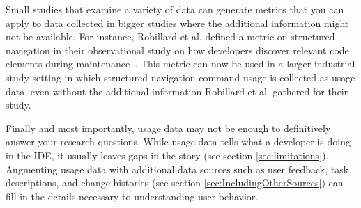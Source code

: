 

Small studies that examine a variety of data can generate metrics that you can apply to data collected in bigger studies where the additional information might not be available. 
        For instance, Robillard et al. defined a metric on structured navigation in their observational study on how developers discover relevant code elements during maintenance~\cite{wbsnipes:Robillard2004How}. This metric can now be used in a larger industrial study setting in which structured navigation command usage is collected as usage data, even without the additional information Robillard et al. gathered for their study.

Finally and most importantly, usage data may not be enough to definitively answer your research questions. While usage data tells what a developer is doing in the IDE, it usually leaves gaps in the story (see section \ref{sec:limitations}).  Augmenting usage data with additional data sources such as user feedback, task descriptions, and change histories (see section \ref{sec:IncludingOtherSources}) can fill in the details necessary to understanding user behavior.